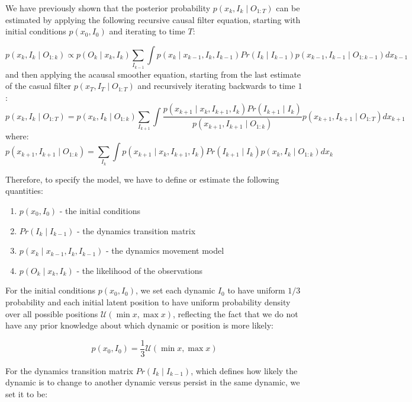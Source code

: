\documentclass[9pt,lineno]{elife}
\begin{document}
We have previously shown \citep{DenovellisCharacterizinghippocampalreplay2019} that the posterior probability $p(x_k, I_k \mid O_{1:T})$ can be estimated by applying the following recursive causal filter equation, starting with initial conditions $p(x_{0}, I_{0})$ and iterating to time $T$:

$$
p(x_{k}, I_{k} \mid O_{1:k}) \propto
p(O_{k}  \mid x_{k}, I_{k}) \sum_{I_{k-1}} \int p(x_{k} \mid x_{k-1}, I_{k}, I_{k-1}) 
Pr(I_{k} \mid I_{k-1}) p(x_{k-1}, I_{k-1} \mid O_{1:k-1}) dx_{k-1}
$$
and then applying the acausal smoother equation, starting from the last estimate of the casual filter $p(x_{T}, I_{T} \mid O_{1:T})$ and recursively iterating backwards to time $1$:
$$
p(x_{k}, I_{k} \mid O_{1:T}) =
p(x_{k}, I_{k} \mid O_{1:k})
\sum_{I_{k+1}} \int \frac{p(x_{k+1} \mid x_{k}, I_{k+1}, I_{k})
Pr(I_{k+1} \mid I_{k})}{p(x_{k+1}, I_{k+1} \mid O_{1:k})}
p(x_{k+1}, I_{k+1} \mid O_{1:T}) dx_{k+1}
$$
where:
$$
p(x_{k+1}, I_{k+1} \mid O_{1:k}) =
\sum_{I_{k}} \int p(x_{k+1} \mid x_{k}, I_{k+1}, I_{k}) Pr(I_{k+1} \mid I_{k})
p(x_{k}, I_{k} \mid O_{1:k}) dx_{k}
$$

Therefore, to specify the model, we have to define or estimate the following quantities:
\begin{enumerate}
  \item $p(x_{0}, I_{0})$ - the initial conditions
  \item $Pr(I_{k} \mid I_{k-1})$ - the dynamics transition matrix
  \item $p(x_{k} \mid x_{k-1}, I_{k}, I_{k-1})$ - the dynamics movement model
  \item $p(O_{k}  \mid x_{k}, I_{k})$ - the likelihood of the observations
\end{enumerate}

For the initial conditions $p(x_{0}, I_{0})$, we set each dynamic $I_0$ to have uniform $1/3$ probability and each initial latent position to have uniform probability density over all possible positions $\mathcal{U}(\min x, \max x)$, reflecting the fact that we do not have any prior knowledge about which dynamic or position is more likely:

\begin{equation*}
  p(x_{0}, I_{0}) = \frac{1}{3} \mathcal{U}(\min x, \max x)
\end{equation*}

For the dynamics transition matrix $Pr(I_{k} \mid I_{k-1})$, which defines how likely the dynamic is to change to another dynamic versus persist in the same dynamic, we set it to be:
\end{document}

